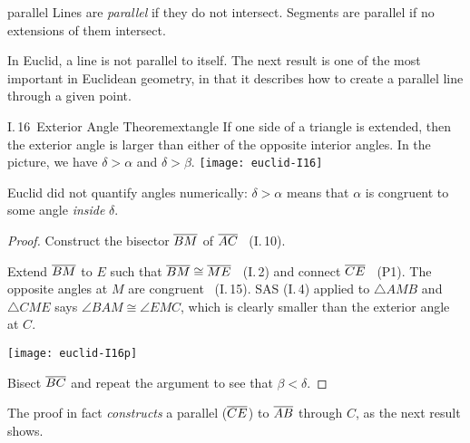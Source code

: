 \goodbreak



\begin{defn}{}{parallel}
	Lines are \emph{parallel} if they do not intersect. Segments are parallel if no extensions of them intersect.
\end{defn}

In Euclid, a line is not parallel to itself. The next result is one of the most important in Euclidean geometry, in that it describes how to create a parallel line through a given point.


\begin{thm}[lower separated=false, sidebyside, sidebyside align=top seam, sidebyside gap=0pt, righthand width=0.37\linewidth]{I.\,16\ Exterior Angle Theorem}{extangle}
	If one side of a triangle is extended, then the exterior angle is larger than either of the opposite interior angles.\smallbreak
	In the picture, we have $\delta>\alpha$ and $\delta>\beta$.
	\tcblower
	\flushright\texttt{[image: euclid-I16]}
\end{thm}

Euclid did not quantify angles numerically: $\delta>\alpha$ means that $\alpha$ is congruent to some angle \emph{inside} $\delta$.

\begin{proof}
	Construct the bisector $\overline{BM}$ of $\overline{AC}$ \ (I.\,10).\par
	\begin{minipage}[t]{0.64\linewidth}\vspace{-5pt}
		Extend $\overline{BM}$ to $E$ such that $\overline{BM}\cong\overline{ME}$ \  (I.\,2) and connect $\overline{CE}$ \  (P1).\smallbreak
		The opposite angles at $M$ are congruent \ (I.\,15).\smallbreak
		SAS (I.\,4) applied to $\triangle AMB$ and $\triangle CME$ says $\angle BAM\cong\angle EMC$, which is clearly smaller than the exterior angle at $C$.
	\end{minipage}
	\hfill
	\begin{minipage}[t]{0.35\linewidth}\vspace{-20pt}
		\flushright\texttt{[image: euclid-I16p]}
	\end{minipage}
	\smallbreak
	Bisect $\overline{BC}$ and repeat the argument to see that $\beta<\delta$.
\end{proof}

The proof in fact \emph{constructs} a parallel ($\overline{CE}$) to $\overline{AB}$ through $C$, as the next result shows.

